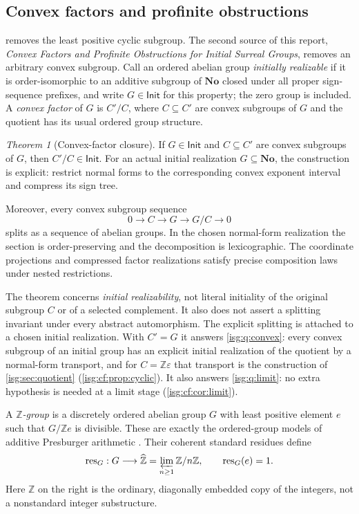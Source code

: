 \documentclass[11pt]{article}
\theoremstyle{definition}
\theoremstyle{remark}
\newtheorem{maintheorem}{Theorem}
\newcommand{\No}{\ensuremath{\mathbf{No}}}
\newcommand{\Z}{\mathbb{Z}}
\newcommand{\Zhat}{\widehat{\Z}}
\newcommand{\IR}{\mathsf{Init}}
\newcommand{\res}{\operatorname{res}}
\begin{document}
\subsection{Convex factors and profinite obstructions}\label{isg:cf:sec:intro}
 removes the least positive cyclic subgroup. The second
source of this report, \emph{Convex Factors and Profinite Obstructions for
Initial Surreal Groups}, removes an arbitrary convex subgroup. Call an
ordered abelian group \emph{initially realizable} if it is order-isomorphic
to an additive subgroup of $\No$ closed under all proper sign-sequence
prefixes, and write $G\in\IR$ for this property; the zero group is
included. A \emph{convex factor} of $G$ is $C'/C$, where $C\subseteq C'$
are convex subgroups of $G$ and the quotient has its usual ordered group
structure.

\begin{maintheorem}[Convex-factor closure]\label{isg:cf:main:factor}
If $G\in\IR$ and $C\subseteq C'$ are convex subgroups of $G$, then
$C'/C\in\IR$. For an actual initial realization $G\subseteq\No$, the
construction is explicit: restrict normal forms to the corresponding
convex exponent interval and compress its sign tree.

Moreover, every convex subgroup sequence
\[
 0\longrightarrow C\longrightarrow G\longrightarrow G/C
 \longrightarrow0
\]
splits as a sequence of abelian groups. In the chosen normal-form
realization the section is order-preserving and the decomposition is
lexicographic. The coordinate projections and compressed factor
realizations satisfy precise composition laws under nested restrictions.
\end{maintheorem}

The theorem concerns \emph{initial realizability}, not literal initiality
of the original subgroup $C$ or of a selected complement. It also does
not assert a splitting invariant under every abstract automorphism.
The explicit splitting is attached to a chosen initial realization.
With $C'=G$ it answers \cref{isg:q:convex}: every convex subgroup of an
initial group has an explicit initial realization of the quotient by a
normal-form transport, and for $C=\Z\varepsilon$ that transport is the
construction of \cref{isg:sec:quotient}
(\cref{isg:cf:prop:cyclic}). It also answers \cref{isg:q:limit}: no
extra hypothesis is needed at a limit stage (\cref{isg:cf:cor:limit}).

A \emph{$\Z$-group} is a discretely ordered abelian group $G$ with least
positive element $e$ such that $G/\Z e$ is divisible. These are exactly
the ordered-group models of additive Presburger arithmetic
\cite{Jerabek}. Their coherent standard residues define
\[
 \res_G:G\longrightarrow\Zhat=\varprojlim_{n\ge1}\Z/n\Z,
 \qquad \res_G(e)=1.
\]
Here $\Z$ on the right is the ordinary, diagonally embedded copy of the
integers, not a nonstandard integer substructure.
\end{document}
